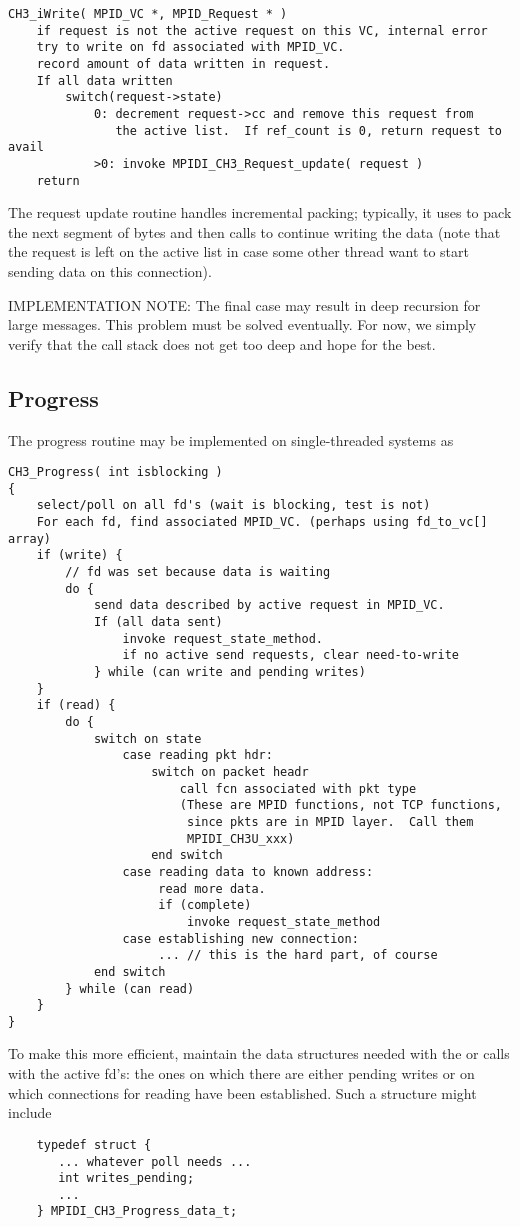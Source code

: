 \documentclass{article}
\begin{document}
\begin{verbatim}
CH3_iWrite( MPID_VC *, MPID_Request * )
    if request is not the active request on this VC, internal error
    try to write on fd associated with MPID_VC.  
    record amount of data written in request.
    If all data written
        switch(request->state)
            0: decrement request->cc and remove this request from
               the active list.  If ref_count is 0, return request to avail
            >0: invoke MPIDI_CH3_Request_update( request )
    return
\end{verbatim}
The request update routine handles incremental packing; typically, it
uses  to pack the next segment of bytes and
then calls  to continue writing the data (note that
the request is left on the active list in case some other thread want
to start sending data on this connection).

IMPLEMENTATION NOTE: The final case may result in deep recursion for
large messages.  This problem must be solved eventually.  For now, we
simply verify that the call stack does not get too deep and hope for
the best.

\subsection{Progress}
\label{sec:progress}
The progress routine may be implemented on single-threaded systems as
\begin{verbatim}
CH3_Progress( int isblocking )
{
    select/poll on all fd's (wait is blocking, test is not)
    For each fd, find associated MPID_VC. (perhaps using fd_to_vc[] array)
    if (write) {
        // fd was set because data is waiting
        do {
            send data described by active request in MPID_VC.  
            If (all data sent)
                invoke request_state_method.
                if no active send requests, clear need-to-write
            } while (can write and pending writes)
    }
    if (read) {
        do {
            switch on state
                case reading pkt hdr: 
                    switch on packet headr
                        call fcn associated with pkt type
                        (These are MPID functions, not TCP functions, 
                         since pkts are in MPID layer.  Call them
                         MPIDI_CH3U_xxx) 
                    end switch
                case reading data to known address:
                     read more data.
                     if (complete)
                         invoke request_state_method
                case establishing new connection:
                     ... // this is the hard part, of course
            end switch
        } while (can read)
    }
}
\end{verbatim}
To make this more efficient, maintain the data structures needed with the
 or  calls with the active fd's: the ones on which
there are either pending writes or on which connections for reading have been
established.  Such a structure might include
\begin{verbatim}
    typedef struct { 
       ... whatever poll needs ...
       int writes_pending;
       ...
    } MPIDI_CH3_Progress_data_t;
\end{verbatim}
\end{document}
